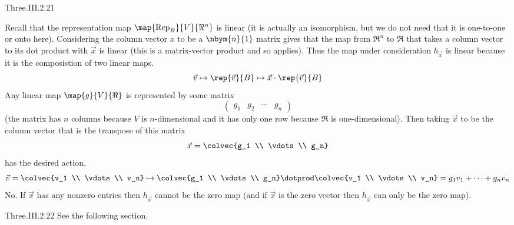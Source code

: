 \begin{ans}{Three.III.2.21}
      \begin{exparts}
        \partsitem Recall that the representation map
          $\map{\mbox{Rep}_{B}}{V}{\Re^n}$ is linear (it is actually
          an isomorphism, but we do not need that it is one-to-one or onto
          here).
          Considering the column vector $x$ to be a $\nbym{n}{1}$ matrix
          gives that the map from $\Re^n$ to $\Re$ that takes a column vector
          to its dot product with $\vec{x}$ is linear (this is a matrix-vector
          product and so  applies).
          Thus the map under consideration $h_{\vec{x}}$ is linear because
          it is the composistion of two linear maps.
          \begin{equation*}
            \vec{v}\mapsto \rep{\vec{v}}{B}
                   \mapsto \vec{x}\cdot\rep{\vec{v}}{B}
          \end{equation*}
       \partsitem Any linear map $\map{g}{V}{\Re}$ is represented by some
          matrix
          \begin{equation*}
            \begin{pmatrix}
              g_1  &g_2 &\cdots &g_n
            \end{pmatrix}
          \end{equation*}
          (the matrix has $n$ columns because $V$ is $n$-dimensional and it
          has only one row because $\Re$ is one-dimensional).
          Then taking $\vec{x}$ to be the column vector that is the transpose
          of this matrix
          \begin{equation*}
            \vec{x}=\colvec{g_1 \\ \vdots \\ g_n}
          \end{equation*}
          has the desired action.
          \begin{equation*}
            \vec{v}=\colvec{v_1 \\ \vdots \\ v_n}
             \mapsto
            \colvec{g_1 \\ \vdots \\ g_n}\dotprod\colvec{v_1 \\ \vdots \\ v_n}
            =g_1v_1+\dots+g_nv_n
          \end{equation*}
        \partsitem No.
          If \( \vec{x} \) has any nonzero entries then \( h_{\vec{x}} \)
          cannot be the zero map (and if \( \vec{x} \) is the zero vector
          then \( h_{\vec{x}} \) can only be the zero map).
      \end{exparts}
    
\end{ans}
\begin{ans}{Three.III.2.22}
       See the following section.
    
\end{ans}
